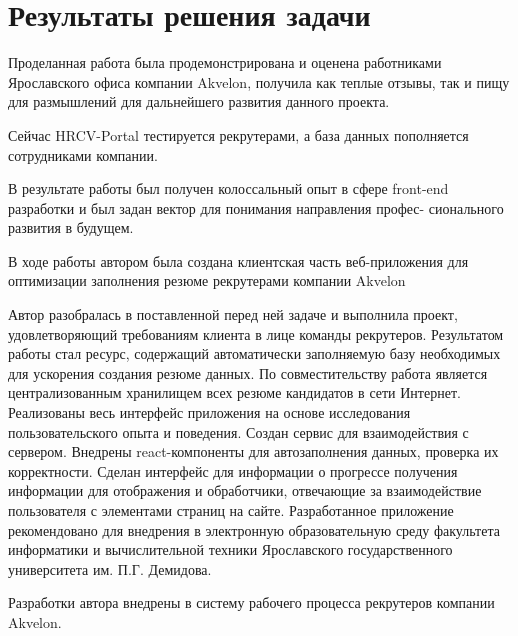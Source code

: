 \documentclass[12pt, a4paper]{diplom}
\begin{document}
\chapter{Результаты решения задачи}

Проделанная работа была продемонстрирована и оценена работниками Ярославского офиса компании Akvelon, получила как теплые 
отзывы, так и пищу для размышлений для дальнейшего развития данного проекта.

Сейчас HRCV-Portal тестируется рекрутерами, а база данных пополняется сотрудниками компании.

В результате работы был получен 
колоссальный опыт в сфере front-end 
разработки и был задан вектор для
понимания направления профес-
сионального развития в будущем.


В ходе работы автором была создана клиентская часть веб-приложения для оптимизации заполнения резюме рекрутерами компании Akvelon 

Автор разобралась в поставленной перед ней задаче и выполнила проект, удовлетворяющий требованиям клиента в лице команды рекрутеров.
Результатом работы стал ресурс, содержащий автоматически заполняемую базу необходимых для ускорения создания резюме данных.
По совместительству работа является централизованным хранилищем всех резюме кандидатов в сети Интернет. 
Реализованы весь интерфейс приложения на основе исследования пользовательского опыта и поведения. Создан сервис для взаимодействия с сервером.
Внедрены react-компоненты для автозаполнения данных, проверка их корректности. Сделан интерфейс для информации о прогрессе получения информации для отображения и обработчики, отвечающие за взаимодействие пользователя с элементами страниц на сайте. 
Разработанное приложение рекомендовано для внедрения в электронную образовательную среду факультета информатики и вычислительной техники Ярославского государственного университета им. П.Г. Демидова.

Разработки автора внедрены в систему рабочего процесса рекрутеров компании Akvelon. 
\end{document}
